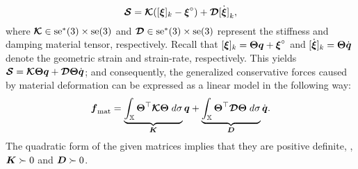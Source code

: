 %
\begin{equation}
\ten{S} = \ten{K} ([\xiB]_k - \xiB^\circ) + \ten{D} \dot{[\xiB]}_k,
\end{equation}
%
where $\mat{\mathcal{K}} \in \cose{3} \times \seg{3}$ and $\mat{\mathcal{D}} \in  \cose{3} \times \seg{3}$ represent the stiffness and damping material tensor, respectively. Recall that $[\xiB]_k = \ThetaB \q + \xiB^\circ$ and $[\dot{\xiB}]_k = \ThetaB \dq$ denote the geometric strain and strain-rate, respectively. This yields $\ten{S} = \ten{K} \ThetaB \q + \ten{D} \ThetaB \dq$; and consequently, the generalized conservative forces caused by material deformation can be expressed as a linear model in the following way:
%
\begin{equation}
\fB_{\textrm{mat}} = \underbrace{\int_\Xs \ThetaB^\top \ten{K} \ThetaB \; d\sigma}_{\KB} \q + \underbrace{\int_\Xs \ThetaB^\top \ten{D} \ThetaB \; d\sigma}_{\DB} \dq. 
\end{equation}
%
The quadratic form of the given matrices implies that they are positive definite, \ie, $\KB \succ 0$ and $\DB \succ 0$.